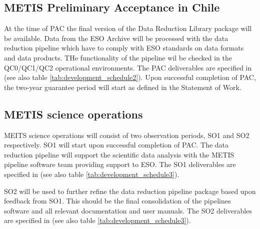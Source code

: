 \subsection{METIS Preliminary Acceptance in Chile}
\label{ssec:pae_chile}

At the time of PAC the final version of the Data Reduction Library package will be available. Data from the ESO Archive will be processed with the data reduction pipeline  which have to comply with ESO standards on data formats and data products. THe functionality of the pipeline wil be checked in the QC0/QC1/QC2 operational environments. The PAC deliverables are specified in \cite{1618} (see also table \ref{tab:development_schedule2}). Upon successful completion of PAC, the two-year guarantee period will start as defined in the Statement of Work.

\subsection{METIS science operations}
\label{ssec:sciops}

MEITS science operations will consist of two observation periods, SO1 and SO2 respectively. SO1 will start upon successful completion of PAC. The data reduction pipeline will support the scientific data analysis with the METIS pipeline software team providing support to ESO. The SO1 deliverables are specified in \cite{1618} (see also table \ref{tab:development_schedule3}).

SO2 will be used to further refine the data reduction pipeline package based upon feedback from SO1. This should be the final consolidation of the pipelines software and all relevant documentation and user manuals. The SO2 deliverables are specified in \cite{1618} (see also table \ref{tab:development_schedule3}).
